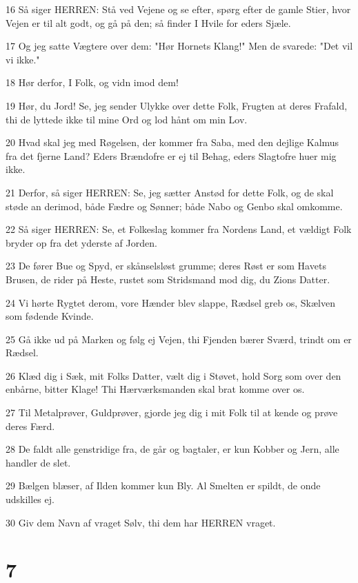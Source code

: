 \par 16 Så siger HERREN: Stå ved Vejene og se efter, spørg efter de gamle Stier, hvor Vejen er til alt godt, og gå på den; så finder I Hvile for eders Sjæle.
\par 17 Og jeg satte Vægtere over dem: "Hør Hornets Klang!" Men de svarede: "Det vil vi ikke."
\par 18 Hør derfor, I Folk, og vidn imod dem!
\par 19 Hør, du Jord! Se, jeg sender Ulykke over dette Folk, Frugten at deres Frafald, thi de lyttede ikke til mine Ord og lod hånt om min Lov.
\par 20 Hvad skal jeg med Røgelsen, der kommer fra Saba, med den dejlige Kalmus fra det fjerne Land? Eders Brændofre er ej til Behag, eders Slagtofre huer mig ikke.
\par 21 Derfor, så siger HERREN: Se, jeg sætter Anstød for dette Folk, og de skal støde an derimod, både Fædre og Sønner; både Nabo og Genbo skal omkomme.
\par 22 Så siger HERREN: Se, et Folkeslag kommer fra Nordens Land, et vældigt Folk bryder op fra det yderste af Jorden.
\par 23 De fører Bue og Spyd, er skånselsløst grumme; deres Røst er som Havets Brusen, de rider på Heste, rustet som Stridsmand mod dig, du Zions Datter.
\par 24 Vi hørte Rygtet derom, vore Hænder blev slappe, Rædsel greb os, Skælven som fødende Kvinde.
\par 25 Gå ikke ud på Marken og følg ej Vejen, thi Fjenden bærer Sværd, trindt om er Rædsel.
\par 26 Klæd dig i Sæk, mit Folks Datter, vælt dig i Støvet, hold Sorg som over den enbårne, bitter Klage! Thi Hærværksmanden skal brat komme over os.
\par 27 Til Metalprøver, Guldprøver, gjorde jeg dig i mit Folk til at kende og prøve deres Færd.
\par 28 De faldt alle genstridige fra, de går og bagtaler, er kun Kobber og Jern, alle handler de slet.
\par 29 Bælgen blæser, af Ilden kommer kun Bly. Al Smelten er spildt, de onde udskilles ej.
\par 30 Giv dem Navn af vraget Sølv, thi dem har HERREN vraget.

\chapter{7}

